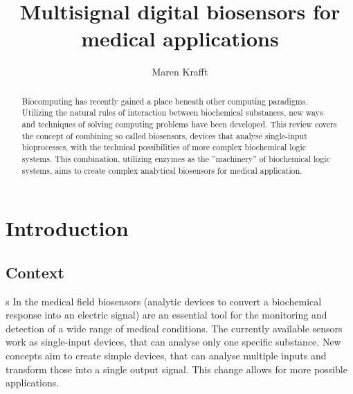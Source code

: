 \documentclass[runningheads]{llncs}
\begin{document}
\title{Multisignal digital biosensors for medical applications}
\author{Maren Krafft}
\maketitle        

      
\begin{abstract}
	
Biocomputing has recently gained a place beneath other computing paradigms. Utilizing the natural rules of interaction between biochemical substances, new ways and techniques of solving computing problems have been developed. This review covers the concept of combining so called biosensors, devices that analyse single-input bioprocesses, with the technical possibilities of more complex biochemical logic systems. This combination, utilizing enzymes as the ''machinery'' of biochemical logic systems, aims to create complex analytical biosensors for medical application.



\end{abstract}


\section{Introduction}

\subsection{Context}
s
	In the medical field biosensors (analytic devices to convert a biochemical response into an electric signal) are an essential tool for the monitoring and detection of a wide range of medical conditions. The currently available sensors work as single-input devices, that can analyse only one specific substance. New concepts aim to create simple devices, that can analyse multiple inputs and transform those into a single output signal. This change allows for more possible applications.\\
	
\end{document}
